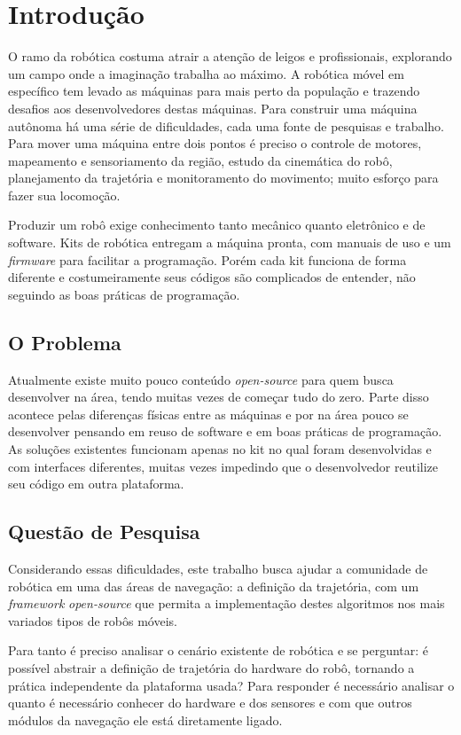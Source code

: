 \chapter[Introdução]{Introdução}

O ramo da robótica costuma atrair a atenção de leigos e profissionais, explorando um campo onde a imaginação trabalha ao máximo. A robótica móvel em específico tem levado as máquinas para mais perto da população e trazendo desafios aos desenvolvedores destas máquinas. Para construir uma máquina autônoma há uma série de dificuldades, cada uma fonte de pesquisas e trabalho. Para mover uma máquina entre dois pontos é preciso o controle de motores, mapeamento e sensoriamento da região, estudo da cinemática do robô, planejamento da trajetória e monitoramento do movimento; muito esforço para fazer sua locomoção.

Produzir um robô exige conhecimento tanto mecânico quanto eletrônico e de software. Kits de robótica entregam a máquina pronta, com manuais de uso e um \textit{firmware} para facilitar a programação. Porém cada kit funciona de forma diferente e costumeiramente seus códigos são complicados de entender, não seguindo as boas práticas de programação.

\section{O Problema}

Atualmente existe muito pouco conteúdo \textit{open-source} para quem busca desenvolver na área, tendo muitas vezes de começar tudo do zero. Parte disso acontece pelas diferenças físicas entre as máquinas e por na área pouco se desenvolver pensando em reuso de software e em boas práticas de programação. As soluções existentes funcionam apenas no kit no qual foram desenvolvidas e com interfaces diferentes, muitas vezes impedindo que o desenvolvedor reutilize seu código em outra plataforma.

\section{Questão de Pesquisa}

Considerando essas dificuldades, este trabalho busca ajudar a comunidade de robótica em uma das áreas de navegação: a definição da trajetória, com um \textit{framework} \textit{open-source} que permita a implementação destes algoritmos nos mais variados tipos de robôs móveis.

Para tanto é preciso analisar o cenário existente de robótica e se perguntar: é possível abstrair a definição de trajetória do hardware do robô, tornando a prática independente da plataforma usada? Para responder é necessário analisar o quanto é necessário conhecer do hardware e dos sensores e com que outros módulos da navegação ele está diretamente ligado.

